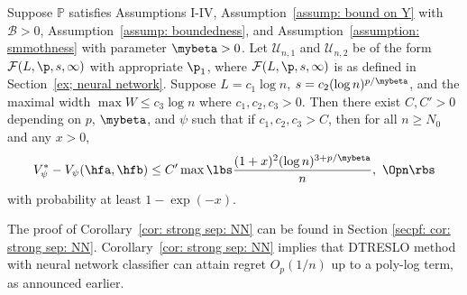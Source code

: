 \documentclass[preprint] {imsart}
\begin{document}
 


\begin{corollary}\label{cor: strong sep: NN}
Suppose $\mathbb P$ satisfies Assumptions I-IV,  Assumption~\ref{assump: bound on Y} with $\mathcal B>0$, Assumption~\ref{assump: boundedness}, and Assumption~\ref{assumption: smmothness} with parameter $\mybeta>0$.
Let $\mathcal U_{n,1}$ and $\mathcal U_{n,2}$ be of the form $\mathcal F(L,\p, s, \infty)$ with appropriate  $\p_1$, where  $\mathcal F(L,\p, s, \infty)$ is as defined in Section~\ref{ex; neural network}. Suppose $L=c_1\log n$,  $s=c_2 (\log n)^{p/\mybeta}$, and the maximal width $\max W\leq c_3 \log n$ where $c_1,c_2,c_3>0$. Then there exist $C,C'>0$ depending on $p$, $\mybeta$, and $\psi$ such that if $c_1,c_2,c_3>C$,  then   for  all $n\geq N_0$ and any $x>0$,  
\[ V_\psi^*-V_{\psi}(\hfa,\hfb)\leq  C'\max\lbs \frac{(1+x)^2(\log n)^{3+p/\mybeta}}{n},\ \Opn\rbs\]
 with probability at least $1-\exp(-x)$.
\end{corollary}
The proof of Corollary~\ref{cor: strong sep: NN} can be found in Section \ref{secpf: cor: strong sep: NN}. Corollary~\ref{cor: strong sep: NN} implies that DTRESLO method with neural network classifier can attain regret  $O_p(1/n)$ up to a poly-log term, as announced earlier. 
\end{document}

